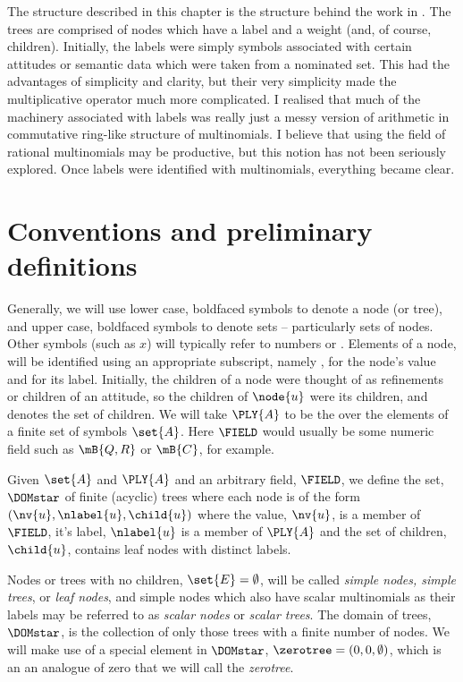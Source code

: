 The structure described in this chapter is the structure behind the
work in \Cfive.  The trees are comprised of
nodes which have a label and a weight (and, of course, children).
Initially, the labels were simply symbols associated with certain
attitudes or semantic data which were taken from a nominated set.
This had the advantages of simplicity and clarity, but their very
simplicity made the multiplicative operator much more complicated. I
realised that much of the machinery associated with labels was really
just a messy version of arithmetic in commutative ring-like structure of
multinomials. I believe that using the field of rational multinomials
may be productive, but this notion has not been seriously explored.
Once labels were identified with multinomials, everything became
clear.

\section{Conventions and preliminary definitions}

Generally, we will use lower case, boldfaced symbols to denote a node
(or tree), and upper case, boldfaced symbols to denote sets  -- 
particularly sets of nodes.  Other symbols (such as \(x\)) will
typically refer to numbers or \polyrat \polyforms. Elements of a
node,  will be identified using an appropriate subscript,
namely , for the node's value and  for its
label. Initially, the children of a node were thought of as
refinements or children of an attitude, so the children of $\node{u}$
were its children, and  denotes the set of children.  We will
take $\PLY{A}$ to be the \polytypes over the elements of a finite set
of symbols $\set{A}$.  Here $\FIELD$ would usually be some numeric
field such as $\mB{Q, R}$ or $\mB{C}$, for example.

\begin{definition}\label{def-of-dom}
  Given $\set{A}$ and $\PLY{A}$ and an arbitrary field, $\FIELD$, we
  define the set, $\DOMstar$ of finite (acyclic) trees where each node is
  of the form $(\nv{u}, \nlabel{u}, \child{u})$ where the value,
  $\nv{u}$, is a member of $\FIELD$, it's label, $\nlabel{u}$ is
  a member of $\PLY{A}$ and the set of children, $\child{u}$, contains
  leaf nodes with distinct labels.
\end{definition}

Nodes or trees with no children, \(\set{E} = \emptyset\), will be
called \emph{simple nodes, simple trees}, or \emph{leaf nodes}, and
simple nodes which also have scalar multinomials as their labels may
be referred to as \emph{scalar nodes} or \emph{scalar trees}. The
domain of trees, $\DOMstar$, is the collection of only those trees
with a finite number of nodes.  We will make use of a special element
in $\DOMstar$, $\zerotree = (0, 0, \emptyset)$, which is an an
analogue of zero that we will call the \emph{zerotree}.

